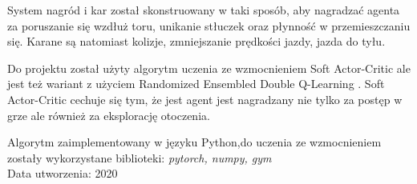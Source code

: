 \documentclass{iiuwb}
\begin{document}
\begin{itemize}
System nagród i kar został skonstruowany w taki sposób, aby nagradzać agenta za poruszanie się wzdłuż toru, unikanie stłuczek oraz płynność w przemieszczaniu się. Karane są natomiast kolizje, zmniejszanie prędkości jazdy, jazda do tyłu. 

Do projektu został użyty algorytm uczenia ze wzmocnieniem Soft Actor-Critic ale jest też wariant z użyciem Randomized Ensembled Double Q-Learning \cite{TrackMania2020}. Soft Actor-Critic cechuje się tym, że jest agent jest nagradzany nie tylko za postęp w grze ale również za eksplorację otoczenia. 

Algorytm zaimplementowany w języku Python,do uczenia ze wzmocnieniem zostały wykorzystane biblioteki: \textit{pytorch, numpy, gym}\\
Data utworzenia: 2020


          
         
          
          

\end{itemize}
\end{document}
